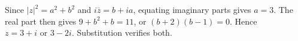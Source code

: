 Since $|z|^2=a^2+b^2$ and $i\overline z=b+ia$, equating imaginary parts gives $a=3$. The real part then gives $9+b^2+b=11$, or $(b+2)(b-1)=0$. Hence $\boxed{z=3+i\text{ or }3-2i}$. Substitution verifies both.
